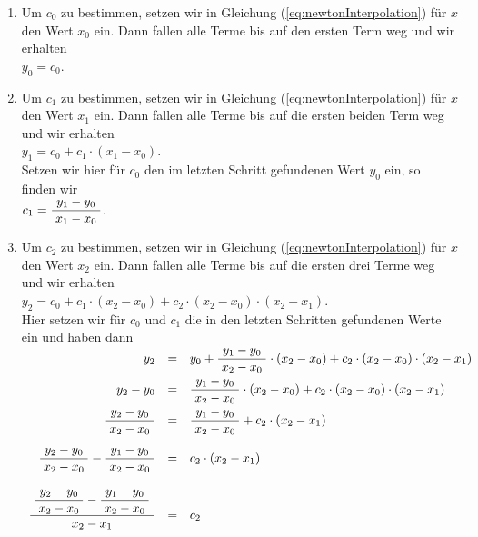 \begin{enumerate}
\item Um $c_0$ zu bestimmen, setzen wir in Gleichung (\ref{eq:newtonInterpolation}) f\"ur 
      $x$ den Wert $x_0$ ein.  Dann fallen alle Terme bis auf den ersten Term weg und wir 
      erhalten
      \\[0.2cm]
      \hspace*{1.3cm}
      $y_0 = c_0$.
\item Um $c_1$ zu bestimmen, setzen wir in Gleichung (\ref{eq:newtonInterpolation}) f\"ur 
      $x$ den Wert $x_1$ ein.  Dann fallen alle Terme bis auf die ersten beiden Term weg und wir 
      erhalten
      \\[0.2cm]
      \hspace*{1.3cm}
      $y_1 = c_0 + c_1\cdot (x_1-x_0)$.
      \\[0.2cm]
      Setzen wir hier f\"ur $c_0$ den im letzten Schritt gefundenen Wert $y_0$ ein, so finden wir 
      \\[0.2cm]
      \hspace*{1.3cm}
      $c_1 = \displaystyle\frac{\;\displaystyle y_1 - y_0\;}{\;\displaystyle x_1 - x_0\;}$.
\item Um $c_2$ zu bestimmen, setzen wir in Gleichung (\ref{eq:newtonInterpolation}) f\"ur 
      $x$ den Wert $x_2$ ein.  Dann fallen alle Terme bis auf die ersten drei Terme weg und wir 
      erhalten
      \\[0.2cm]
      \hspace*{1.3cm}
      $y_2 = c_0 + c_1\cdot (x_2-x_0) + c_2\cdot (x_2-x_0)\cdot (x_2-x_1)$.
      \\[0.2cm]
      Hier setzen wir f\"ur $c_0$ und $c_1$ die in den letzten Schritten gefundenen Werte
      ein und haben dann
      \\[0.2cm]
      \hspace*{1.3cm}
      $
      \begin{array}[t]{rcl}
      y_2 & = & y_0 + \displaystyle\frac{\;\displaystyle y_1 - y_0\;}{\;\displaystyle x_2 - x_0\;} \cdot  (x_2-x_0) + c_2\cdot (x_2-x_0)\cdot (x_2-x_1) \\[0.3cm]
      y_2 - y_0 & = & \displaystyle\frac{\;\displaystyle y_1 - y_0\;}{\;\displaystyle x_2 - x_0\;} \cdot  (x_2-x_0) + c_2\cdot (x_2-x_0)\cdot (x_2-x_1) \\[0.3cm]
      \displaystyle\frac{\;\displaystyle y_2 - y_0\;}{\;\displaystyle x_2-x_0\;} & = & \displaystyle\frac{\;\displaystyle y_1 - y_0\;}{\;\displaystyle x_2 - x_0\;}  + c_2\cdot (x_2-x_1) \\[0.5cm]
      \displaystyle\frac{\;\displaystyle y_2 - y_0\;}{\;\displaystyle x_2-x_0\;} - \displaystyle\frac{\;\displaystyle y_1 - y_0\;}{\;\displaystyle x_2 - x_0\;} & = & c_2\cdot (x_2-x_1) \\[0.6cm]
      \displaystyle\frac{\;\displaystyle\displaystyle\frac{\;\displaystyle y_2 - y_0\;}{\;\displaystyle x_2-x_0\;} - \displaystyle\frac{\;\displaystyle y_1 - y_0\;}{\;\displaystyle x_2 - x_0\;}\;}{\;\displaystyle x_2-x_1\;} & = & c_2 
      \end{array}
      $
\end{enumerate}
